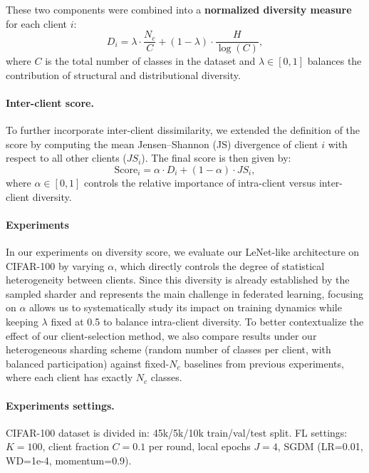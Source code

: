 \documentclass[10pt,twocolumn,letterpaper]{article}
\begin{document}
\noindent These two components were combined into a \textbf{normalized diversity measure} for each client \(i\):
\[
D_i = \lambda \cdot \frac{N_c}{C} + (1 - \lambda) \cdot \frac{H}{\log(C)},
\]
where \(C\) is the total number of classes in the dataset and \(\lambda \in [0,1]\) balances the contribution of structural and distributional diversity.

\paragraph{Inter-client score.} 
To further incorporate inter-client dissimilarity, we extended the definition of the score by computing the mean 
Jensen--Shannon (JS) divergence of client \(i\) with respect to all other clients (\(JS_i\)). 
The final score is then given by:
\[
\text{Score}_i = \alpha \cdot D_i + (1 - \alpha) \cdot JS_i,
\]
where \(\alpha \in [0,1]\) controls the relative importance of intra-client versus inter-client diversity.



\paragraph{Experiments}
In our experiments on diversity score, we evaluate our LeNet-like architecture on CIFAR-100 by varying $\alpha$, which directly controls the degree of statistical heterogeneity between clients. Since this diversity is already established by the sampled sharder and represents the main challenge in federated learning, focusing on $\alpha$ allows us to systematically study its impact on training dynamics while keeping $\lambda$ fixed at 0.5 to balance intra-client diversity. 
\newline To better contextualize the effect of our client-selection method, we also compare results under our heterogeneous sharding scheme (random number of classes per client, with balanced participation) against fixed-$N_c$ baselines from previous experiments, where each client has exactly $N_c$ classes.

\paragraph{Experiments settings.}
CIFAR-100 dataset is divided in: 45k/5k/10k train/val/test split.
FL settings: $K=100$, client fraction $C =0.1$ per round, local epochs $J=4$,  SGDM (LR=0.01, WD=1e-4, momentum=0.9).
\end{document}
